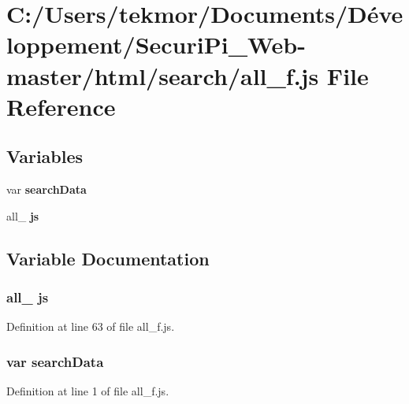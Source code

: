\section{C\+:/\+Users/tekmor/\+Documents/\+Développement/\+Securi\+Pi\+\_\+\+Web-\/master/html/search/all\+\_\+f.js File Reference}
\label{all__f_8js}
\subsection*{Variables}
\begin{DoxyCompactItemize}
\item 
var {\bf search\+Data}
\item 
all\+\_ {\bf js}
\end{DoxyCompactItemize}


\subsection{Variable Documentation}
\subsubsection[{js}]{\setlength{\rightskip}{0pt plus 5cm}all\+\_ js}\label{all__f_8js_afaf106b88915265e8d32d45b061b4402}


Definition at line 63 of file all\+\_\+f.\+js.

\subsubsection[{search\+Data}]{\setlength{\rightskip}{0pt plus 5cm}var search\+Data}\label{all__f_8js_ad01a7523f103d6242ef9b0451861231e}


Definition at line 1 of file all\+\_\+f.\+js.

